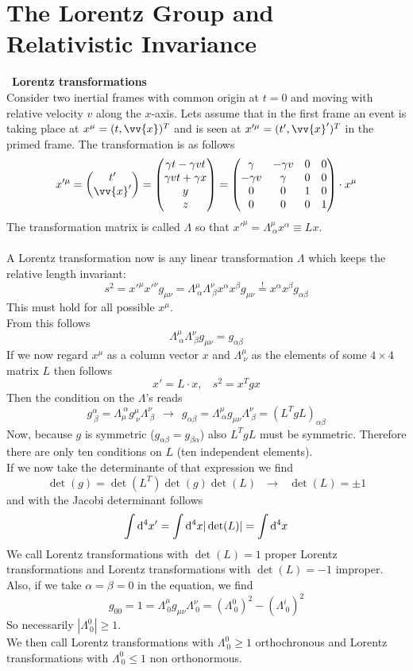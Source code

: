 \documentclass{include/thesisclass}
\newcommand{\cc}{\cdot}
\newcommand{\vx}{\vv{x}}
\newcommand{\df}{\rightarrow}
\newcommand{\dd}{{\rm d}}
\newcommand{\soll}{\overset{!}{=}}
\newcommand{\vektorz}[2]{\begin{pmatrix} #1 \\ #2 \end{pmatrix}}
\newcommand{\sub}[1]{~\newline\newline\textbf{#1}\\}
\begin{document}
\section{The Lorentz Group and Relativistic Invariance}
\sub{Lorentz transformations}
Consider two inertial frames with common origin at $t = 0$ and moving with relative velocity $v$ along the $x$-axis. Lets assume that in the first frame an event is taking place at $x^\mu = (t, \vx)^T$ and is seen at $x'^\mu = (t', \vx')^T$ in the primed frame. The transformation is as follows
\[ x'^\mu = \vektorz{t'}{\vx'} = \begin{pmatrix} \gamma t - \gamma v t \\  \gamma v t + \gamma x\\ y \\z\end{pmatrix} = \begin{pmatrix} \gamma & - \gamma v & 0 & 0 \\ -\gamma v & \gamma & 0 & 0 \\ 0 & 0 & 1 & 0 \\ 0 & 0 & 0 & 1\end{pmatrix}\cc x^\mu\]
The transformation matrix is called $\Lambda$ so that $x'^\mu = \Lambda^\mu_{~\alpha} x^\alpha \equiv L x$.\\
\\A Lorentz transformation now is any linear transformation $\Lambda$ which keeps the relative length invariant:
\[ s^2 = x'^\mu x'^\nu g_{\mu\nu} = \Lambda^\mu_{~\alpha} \Lambda^\nu_{~\beta}x^\alpha x^\beta g_{\mu\nu}\soll x^\alpha x^\beta g_{\alpha\beta}\]
This must hold for all possible $x^\mu$.\\
From this follows
\[ \Lambda^\mu_{~\alpha} \Lambda^\nu_{~\beta} g_{\mu\nu} = g_{\alpha\beta}\]
If we now regard $x^\mu$ as a column vector $x$ and $\Lambda^\mu_{~\nu}$ as the elements of some $4\times 4$ matrix $L$ then follows
\[x' = L \cc x, ~~~~ s^2 = x^Tg x\]
Then the condition on the $\Lambda$'s reads
\[g^\alpha_{~\beta} = \Lambda_\mu^{~\alpha} g^\mu_{~\nu} \Lambda^\nu_{~\beta}~~\df~~ g_{\alpha\beta} = \Lambda^\mu_{~\alpha} g_{\mu\nu}\Lambda^\nu_{~\beta} = (L^TgL)_{\alpha\beta}\]
Now, because $g$ is symmetric ($g_{\alpha\beta} = g_{\beta\alpha}$) also $L^TgL$ must be symmetric. Therefore there are only ten conditions on $L$ (ten independent elements).\\
If we now take the determinante of that expression we find
\[\det(g) = \det(L^T)\det(g) \det(L)~~~\df~~~ \det(L) = \pm 1\]
and with the Jacobi determinant follows
\[ \int \dd ^4 x' = \int \dd ^4 x| \det(L) | = \int \dd ^4 x\]
We call Lorentz transformations with $\det(L) = 1$ proper Lorentz transformations and Lorentz transformations with $\det(L) = -1$ improper.\\
Also, if we take $\alpha = \beta = 0$ in the equation, we find 
\[g_{00} = 1 = \Lambda^{\mu}_{~0} g_{\mu\nu} \Lambda^\nu_{~0} = (\Lambda^0_{~0})^2 - (\Lambda^i_{~0})^2\]
So necessarily $|\Lambda^0_{~0}| \geq 1$.\\
We then call Lorentz transformations with $\Lambda^0_{~0} \geq 1$ orthochronous and Lorentz transformations with $\Lambda^0_{~0} \leq 1$ non orthonormous.
\end{document}
